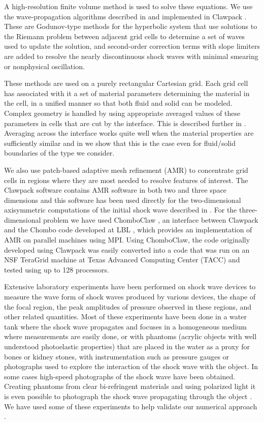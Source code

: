 \documentclass{article}
\begin{document}
A high-resolution finite volume method is used to solve these equations.
We use the wave-propagation algorithms described in \cite{rjl_book}
and implemented in Clawpack \cite{claw.org.url}.  These are Godunov-type
methods for the hyperbolic system that use solutions to the Riemann problem
between adjacent grid cells to determine a set of waves used to update the
solution, and second-order correction terms with slope limiters are added to
resolve the nearly discontinuous shock waves with minimal smearing or
nonphysical oscillation.

These methods are used on a purely rectangular Cartesian grid.  Each
grid cell has associated with it a set of material parameters
determining the material in the cell, in a unified manner so that
both fluid and solid can be modeled.   Complex geometry is handled
by using appropriate averaged values of these parameters in cells
that are cut by the interface.  This is described further in .
Averaging across the interface works quite well when the material properties
are sufficiently similar and in  we show that this is the case even
for fluid/solid boundaries of the type we consider.  

We also use patch-based adaptive mesh refinement (AMR) to concentrate
grid cells in regions where they are most needed to resolve features
of interest.  The Clawpack software contains AMR software in both
two and three space dimensions and this software has been used
directly for the two-dimensional axisymmetric computations of the
initial shock wave described in .  For the three-dimensional
problem we have used ChomboClaw \cite{chomboclaw}, an interface between
Clawpack and the Chombo code developed at LBL \cite{chombo}, which
provides an implementation of AMR on parallel machines using MPI.
Using ChomboClaw, the code originally developed using Clawpack was
easily converted into a code that was run on an NSF TeraGrid machine at
Texas Advanced Computing Center (TACC) and tested using up to 128 processors.


Extensive laboratory experiments have been performed on
shock wave devices to measure the wave form of shock waves produced by
various devices, the shape of the focal region, the peak amplitudes of
pressure observed in these regions, and other related quantities.  Most of
these experiments have been done in a water tank where the shock wave
propagates and focuses in a homogeneous medium where measurements are easily
done, or with phantoms (acrylic objects with well understood photoelastic properties)
 that are placed in the water as a proxy for bones or
kidney stones, with instrumentation such as pressure gauges or photographs
used to explore the interaction of the shock wave with the object.  In some
cases high-speed photographs of the shock wave have been obtained.
Creating phantoms from clear bi-refringent materials and using polarized
light it is even possible to photograph the shock wave propagating through
the object \cite{oleg_bailey}.  We have used some of these experiments to help
validate our numerical approach \cite{kfagnan_hyp06}.
\end{document}
